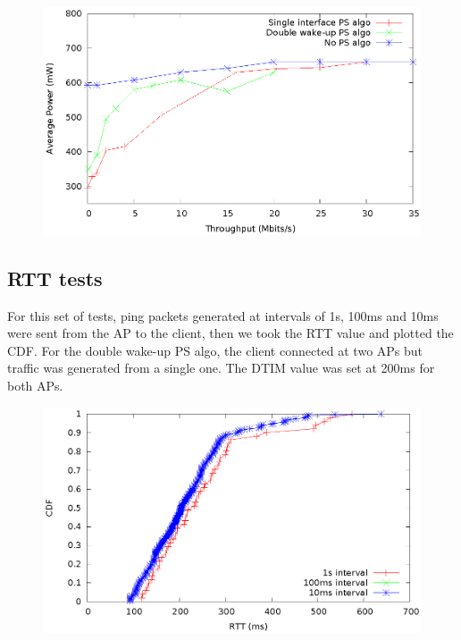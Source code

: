 \begin{figure}
\includegraphics{src/img/exp2.eps}
\label{img:exp2}
\end{figure}

\subsection{RTT tests}
\label{sub-sec:rtt}
For this set of tests, ping packets generated at intervals of 1s, 100ms and 10ms were sent from the AP to the client, then we took the RTT value and plotted the CDF. For the double wake-up PS algo, the client connected at two APs but traffic was generated from a single one. The DTIM value was set at 200ms for both APs.


\begin{figure}[bp!]
\includegraphics{src/img/cdfsingle.eps}
\label{img:cdfsingle}
\end{figure}

